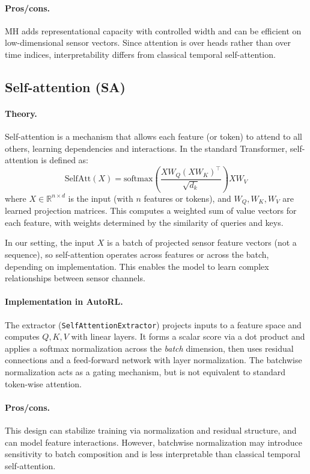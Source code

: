 \documentclass[11pt]{article}
\begin{document}
\paragraph{Pros/cons.}
MH adds representational capacity with controlled width and can be efficient on low-dimensional sensor vectors. Since attention is over heads rather than over time indices, interpretability differs from classical temporal self-attention.

\subsection{Self-attention (SA)}
\paragraph{Theory.}
Self-attention is a mechanism that allows each feature (or token) to attend to all others, learning dependencies and interactions. In the standard Transformer, self-attention is defined as:
\begin{equation}
  \mathrm{SelfAtt}(X) = \mathrm{softmax}\left(\frac{XW_Q (XW_K)^\top}{\sqrt{d_k}}\right) XW_V
\end{equation}
where $X \in \mathbb{R}^{n \times d}$ is the input (with $n$ features or tokens), and $W_Q, W_K, W_V$ are learned projection matrices. This computes a weighted sum of value vectors for each feature, with weights determined by the similarity of queries and keys.

In our setting, the input $X$ is a batch of projected sensor feature vectors (not a sequence), so self-attention operates across features or across the batch, depending on implementation. This enables the model to learn complex relationships between sensor channels.

\paragraph{Implementation in AutoRL.}
The extractor (\texttt{SelfAttentionExtractor}) projects inputs to a feature space and computes $Q,K,V$ with linear layers. It forms a scalar score via a dot product and applies a softmax normalization across the \emph{batch} dimension, then uses residual connections and a feed-forward network with layer normalization. The batchwise normalization acts as a gating mechanism, but is not equivalent to standard token-wise attention.

\paragraph{Pros/cons.}
This design can stabilize training via normalization and residual structure, and can model feature interactions. However, batchwise normalization may introduce sensitivity to batch composition and is less interpretable than classical temporal self-attention.
\end{document}
